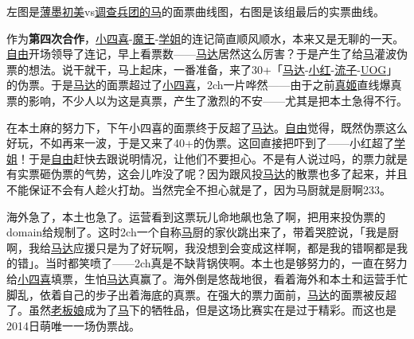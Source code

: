 
左图是\uline{薄墨初美}vs\uline{调查兵团的马}的面票曲线图，右图是该组最后的实票曲线。

作为\textbf{第四次合作}，\uline{小四喜}-\uline{魔王}-\uline{学姐}的连记简直顺风顺水，本来又是无聊的一天。\uline{自由}开场领导了连记，早上看票数——\uline{马达}居然这么厉害？于是产生了给\uline{马}灌波伪票的想法。说干就干，马上起床，一番准备，来了30+「\uline{马达}-\uline{小红}-\uline{流子}-\uline{UOG}」的伪票。于是\uline{马达}的面票超过了\uline{小四喜}，2ch一片哗然——由于之前\uline{真姬}直线爆真票的影响，不少人以为这是真票，产生了激烈的不安——尤其是把本土急得不行。

在本土麻的努力下，下午小四喜的面票终于反超了\uline{马达}。\uline{自由}觉得，既然伪票这么好玩，不如再来一波，于是又来了40+的伪票。这回直接把吓到了——小红超了\uline{学姐}！于是\uline{自由}赶快去跟说明情况，让他们不要担心。不是有人说过吗，的票力就是有实票砸伪票的气势，这会儿咋没了呢？因为跟风投\uline{马达}的散票也多了起来，并且不能保证不会有人趁火打劫。当然完全不担心就是了，因为马厨就是厨啊233。

海外急了，本土也急了。运营看到这票玩儿命地飙也急了啊，把用来投伪票的domain给规制了。这时2ch一个自称\uline{马}厨的家伙跳出来了，带着哭腔说，「我是厨啊，我给\uline{马达}应援只是为了好玩啊，我没想到会变成这样啊，都是我的错啊都是我的错」。当时都笑喷了——2ch真是不缺背锅侠啊。本土也是够努力的，一直在努力给\uline{小四喜}填票，生怕\uline{马达}真赢了。海外倒是悠哉地很，看着海外和本土和运营手忙脚乱，依着自己的步子出着海底的真票。在强大的票力面前，\uline{马达}的面票被反超了。虽然\uline{老板娘}成为了\uline{马}下的牺牲品，但是这场比赛实在是过于精彩。而这也是2014日萌唯一一场伪票战。

